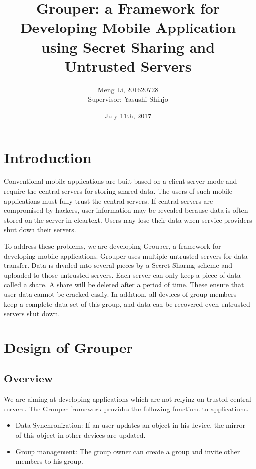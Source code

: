 \documentclass[twocolumn,10pt]{article}
\begin{document}
\small
\date{July 11th, 2017}

\title{\bf Grouper: a Framework for Developing Mobile Application using Secret Sharing and Untrusted Servers}

\author{
	Meng Li, 201620728  
	\\ Supervisor: Yasushi Shinjo
}

\maketitle

\section{Introduction}

Conventional mobile applications are built based on a client-server mode and require the central servers for storing shared data. 
The users of such mobile applications must fully trust the central servers. 
If central servers are compromised by hackers, user information may be revealed because data is often stored on the server in cleartext. 
Users may lose their data when service providers shut down their servers. 

To address these problems, we are developing Grouper, a framework for developing mobile applications. 
Grouper uses multiple untrusted servers for data transfer.
Data is divided into several pieces by a Secret Sharing scheme and uploaded to those untrusted servers. 
Each server can only keep a piece of data called a share. A share will be deleted after a period of time. 
These ensure that user data cannot be cracked easily. 
In addition, all devices of group members keep a complete data set of this group, and data can be recovered even untrusted servers shut down.

\section{Design of Grouper}

\subsection{Overview}

We are aiming at developing applications which are not relying on trusted central servers. 
The Grouper framework provides the following functions to applications.

\begin{itemize}
	\setlength{\itemsep}{1pt}
	\setlength{\parskip}{0pt}
	\setlength{\parsep}{0pt}
	\item Data Synchronization: If an user updates an object in his device, the mirror of this object in other devices are updated.
	\item Group management: The group owner can create a group and invite other members to his group.
\end{itemize}
\end{document}
